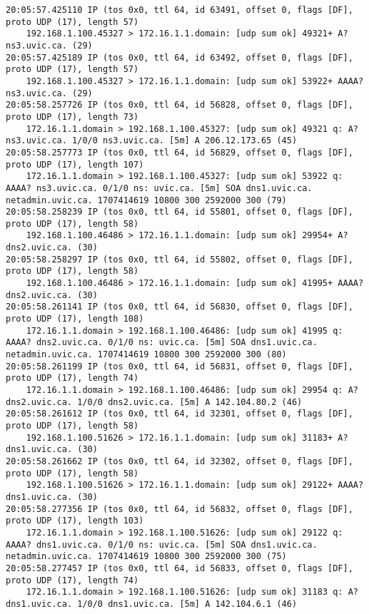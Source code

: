 \documentclass{article}
\begin{document}
{\begin{lstlisting}
20:05:57.425110 IP (tos 0x0, ttl 64, id 63491, offset 0, flags [DF], proto UDP (17), length 57)
    192.168.1.100.45327 > 172.16.1.1.domain: [udp sum ok] 49321+ A? ns3.uvic.ca. (29)
20:05:57.425189 IP (tos 0x0, ttl 64, id 63492, offset 0, flags [DF], proto UDP (17), length 57)
    192.168.1.100.45327 > 172.16.1.1.domain: [udp sum ok] 53922+ AAAA? ns3.uvic.ca. (29)
20:05:58.257726 IP (tos 0x0, ttl 64, id 56828, offset 0, flags [DF], proto UDP (17), length 73)
    172.16.1.1.domain > 192.168.1.100.45327: [udp sum ok] 49321 q: A? ns3.uvic.ca. 1/0/0 ns3.uvic.ca. [5m] A 206.12.173.65 (45)
20:05:58.257773 IP (tos 0x0, ttl 64, id 56829, offset 0, flags [DF], proto UDP (17), length 107)
    172.16.1.1.domain > 192.168.1.100.45327: [udp sum ok] 53922 q: AAAA? ns3.uvic.ca. 0/1/0 ns: uvic.ca. [5m] SOA dns1.uvic.ca. netadmin.uvic.ca. 1707414619 10800 300 2592000 300 (79)
20:05:58.258239 IP (tos 0x0, ttl 64, id 55801, offset 0, flags [DF], proto UDP (17), length 58)
    192.168.1.100.46486 > 172.16.1.1.domain: [udp sum ok] 29954+ A? dns2.uvic.ca. (30)
20:05:58.258297 IP (tos 0x0, ttl 64, id 55802, offset 0, flags [DF], proto UDP (17), length 58)
    192.168.1.100.46486 > 172.16.1.1.domain: [udp sum ok] 41995+ AAAA? dns2.uvic.ca. (30)
20:05:58.261141 IP (tos 0x0, ttl 64, id 56830, offset 0, flags [DF], proto UDP (17), length 108)
    172.16.1.1.domain > 192.168.1.100.46486: [udp sum ok] 41995 q: AAAA? dns2.uvic.ca. 0/1/0 ns: uvic.ca. [5m] SOA dns1.uvic.ca. netadmin.uvic.ca. 1707414619 10800 300 2592000 300 (80)
20:05:58.261199 IP (tos 0x0, ttl 64, id 56831, offset 0, flags [DF], proto UDP (17), length 74)
    172.16.1.1.domain > 192.168.1.100.46486: [udp sum ok] 29954 q: A? dns2.uvic.ca. 1/0/0 dns2.uvic.ca. [5m] A 142.104.80.2 (46)
20:05:58.261612 IP (tos 0x0, ttl 64, id 32301, offset 0, flags [DF], proto UDP (17), length 58)
    192.168.1.100.51626 > 172.16.1.1.domain: [udp sum ok] 31183+ A? dns1.uvic.ca. (30)
20:05:58.261662 IP (tos 0x0, ttl 64, id 32302, offset 0, flags [DF], proto UDP (17), length 58)
    192.168.1.100.51626 > 172.16.1.1.domain: [udp sum ok] 29122+ AAAA? dns1.uvic.ca. (30)
20:05:58.277356 IP (tos 0x0, ttl 64, id 56832, offset 0, flags [DF], proto UDP (17), length 103)
    172.16.1.1.domain > 192.168.1.100.51626: [udp sum ok] 29122 q: AAAA? dns1.uvic.ca. 0/1/0 ns: uvic.ca. [5m] SOA dns1.uvic.ca. netadmin.uvic.ca. 1707414619 10800 300 2592000 300 (75)
20:05:58.277457 IP (tos 0x0, ttl 64, id 56833, offset 0, flags [DF], proto UDP (17), length 74)
    172.16.1.1.domain > 192.168.1.100.51626: [udp sum ok] 31183 q: A? dns1.uvic.ca. 1/0/0 dns1.uvic.ca. [5m] A 142.104.6.1 (46)

\end{lstlisting}}
\end{document}
